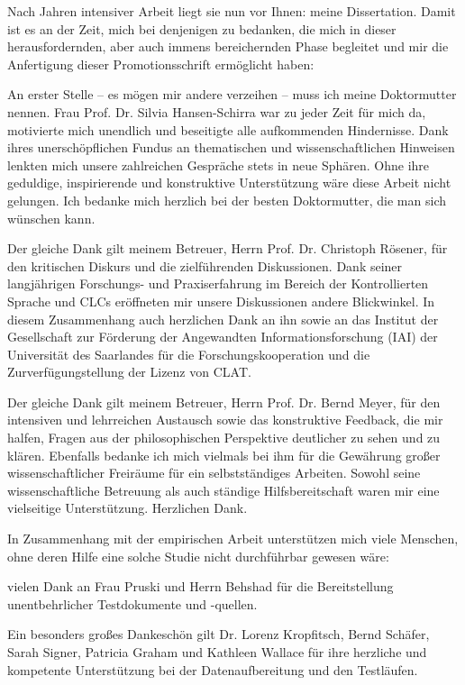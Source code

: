 \addchap{\lsAcknowledgementTitle}


Nach Jahren intensiver Arbeit liegt sie nun vor Ihnen: meine Dissertation. Damit ist es an der Zeit, mich bei denjenigen zu bedanken, die mich in dieser herausfordernden, aber auch immens bereichernden Phase begleitet und mir die Anfertigung dieser Promotionsschrift ermöglicht haben:

An erster Stelle -- es mögen mir andere verzeihen -- muss ich meine Doktormutter nennen. Frau Prof. Dr. Silvia Hansen-Schirra war zu jeder Zeit für mich da, motivierte mich unendlich und beseitigte alle aufkommenden Hindernisse. Dank ihres unerschöpflichen Fundus an thematischen und wissenschaftlichen Hinweisen lenkten mich unsere zahlreichen Gespräche stets in neue Sphären. Ohne ihre geduldige, inspirierende und konstruktive Unterstützung wäre diese Arbeit nicht gelungen. Ich bedanke mich herzlich bei der besten Doktormutter, die man sich wünschen kann.

Der gleiche Dank gilt meinem Betreuer, Herrn Prof. Dr. Christoph Rösener, für den kritischen Diskurs und die zielführenden Diskussionen. Dank seiner langjährigen Forschungs- und Praxiserfahrung im Bereich der Kontrollierten Sprache und CLCs eröffneten mir unsere Diskussionen andere Blickwinkel. In diesem Zusammenhang auch herzlichen Dank an ihn sowie an das Institut der Gesellschaft zur Förderung der Angewandten Informationsforschung (IAI) der Universität des Saarlandes für die Forschungskooperation und die Zurverfügungstellung der Lizenz von CLAT.

Der gleiche Dank gilt meinem Betreuer, Herrn Prof. Dr. Bernd Meyer, für den intensiven und lehrreichen Austausch sowie das konstruktive Feedback, die mir halfen, Fragen aus der philosophischen Perspektive deutlicher zu sehen und zu klären. Ebenfalls bedanke ich mich vielmals bei ihm für die Gewährung großer wissenschaftlicher Freiräume für ein selbstständiges Arbeiten. Sowohl seine wissenschaftliche Betreuung als auch ständige Hilfsbereitschaft waren mir eine vielseitige Unterstützung. Herzlichen Dank.

In Zusammenhang mit der empirischen Arbeit unterstützen mich viele Menschen, ohne deren Hilfe eine solche Studie nicht durchführbar gewesen wäre:

vielen Dank an Frau Pruski und Herrn Behshad für die Bereitstellung unentbehrlicher Testdokumente und -quellen.

Ein besonders großes Dankeschön gilt Dr. Lorenz Kropfitsch, Bernd Schäfer, Sarah Signer, Patricia Graham und Kathleen Wallace für ihre herzliche und kompetente Unterstützung bei der Datenaufbereitung und den Testläufen.

